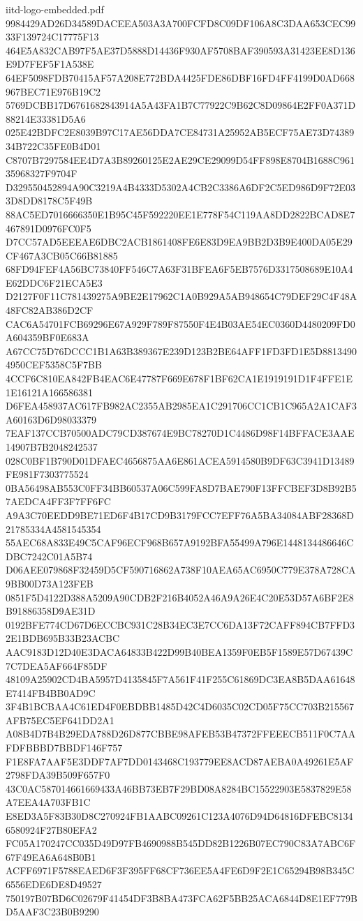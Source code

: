 \begin{filecontents*}[overwrite]{iitd-logo-embedded.pdf}
9984429AD26D34589DACEEA503A3A700FCFD8C09DF106A8C3DAA653CEC9933F139724C17775F13
464E5A832CAB97F5AE37D5888D14436F930AF5708BAF390593A31423EE8D136E9D7FEF5F1A538E
64EF5098FDB70415AF57A208E772BDA4425FDE86DBF16FD4FF4199D0AD668967BEC71E976B19C2
5769DCBB17D6761682843914A5A43FA1B7C77922C9B62C8D09864E2FF0A371D88214E33381D5A6
025E42BDFC2E8039B97C17AE56DDA7CE84731A25952AB5ECF75AE73D7438934B722C35FE0B4D01
C8707B7297584EE4D7A3B89260125E2AE29CE29099D54FF898E8704B1688C96135968327F9704F
D329550452894A90C3219A4B4333D5302A4CB2C3386A6DF2C5ED986D9F72E033D8DD8178C5F49B
88AC5ED7016666350E1B95C45F592220EE1E778F54C119AA8DD2822BCAD8E7467891D0976FC0F5
D7CC57AD5EEEAE6DBC2ACB1861408FE6E83D9EA9BB2D3B9E400DA05E29CF467A3CB05C66B81885
68FD94FEF4A56BC73840FF546C7A63F31BFEA6F5EB7576D3317508689E10A4E62DDC6F21ECA5E3
D2127F0F11C781439275A9BE2E17962C1A0B929A5AB948654C79DEF29C4F48A48FC82AB386D2CF
CAC6A54701FCB69296E67A929F789F87550F4E4B03AE54EC0360D4480209FD0A604359BF0E683A
A67CC75D76DCCC1B1A63B389367E239D123B2BE64AFF1FD3FD1E5D88134904950CEF5358C5F7BB
4CCF6C810EA842FB4EAC6E47787F669E678F1BF62CA1E1919191D1F4FFE1E1E16121A166586381
D6FEA458937AC617FB982AC2355AB2985EA1C291706CC1CB1C965A2A1CAF3A60163D6D98033379
7EAF137CCB70500ADC79CD387674E9BC78270D1C4486D98F14BFFACE3AAE14907B7B2048242537
028C0BF1B790D01DFAEC4656875AA6E861ACEA5914580B9DF63C3941D13489FE981F7303775524
0BA56498AB553C0FF34BB60537A06C599FA8D7BAE790F13FFCBEF3D8B92B57AEDCA4FF3F7FF6FC
A9A3C70EEDD9BE71ED6F4B17CD9B3179FCC7EFF76A5BA34084ABF28368D21785334A4581545354
55AEC68A833E49C5CAF96ECF968B657A9192BFA55499A796E1448134486646CDBC7242C01A5B74
D06AEE079868F32459D5CF590716862A738F10AEA65AC6950C779E378A728CA9BB00D73A123FEB
0851F5D4122D388A5209A90CDB2F216B4052A46A9A26E4C20E53D57A6BF2E8B91886358D9AE31D
0192BFE774CD67D6ECCBC931C28B34EC3E7CC6DA13F72CAFF894CB7FFD32E1BDB695B33B23ACBC
AAC9183D12D40E3DACA64833B422D99B40BEA1359F0EB5F1589E57D67439C7C7DEA5AF664F85DF
48109A25902CD4BA5957D4135845F7A561F41F255C61869DC3EA8B5DAA61648E7414FB4BB0AD9C
3F4B1BCBAA4C61ED4F0EBDBB1485D42C4D6035C02CD05F75CC703B215567AFB75EC5EF641DD2A1
A08B4D7B4B29EDA788D26D877CBBE98AFEB53B47372FFEEECB511F0C7AAFDFBBBD7BBDF146F757
F1E8FA7AAF5E3DDF7AF7DD0143468C193779EE8ACD87AEBA0A49261E5AF2798FDA39B509F657F0
43C0AC587014661669433A46BB73EB7F29BD08A8284BC15522903E5837829E58A7EEA4A703FB1C
E8ED3A5F83B30D8C270924FB1AABC09261C123A4076D94D64816DFEBC81346580924F27B80EFA2
FC05A170247CC035D49D97FB4690988B545DD82B1226B07EC790C83A7ABC6F67F49EA6A648B0B1
ACFF6971F5788EAED6F3F395FF68CF736EE5A4FE6D9F2E1C65294B98B345C6556EDE6DE8D49527
750197B07BD6C02679F41454DF3B8BA473FCA62F5BB25ACA6844D8E1EF779BD5AAF3C23B0B9290

\end{filecontents*}
